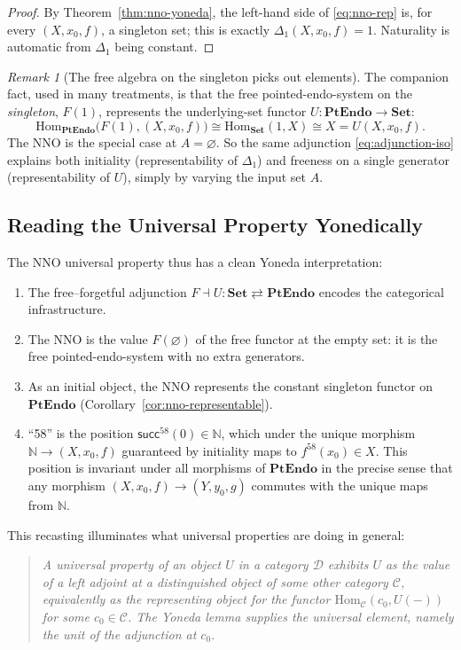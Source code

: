 \documentclass[12pt]{article}
\theoremstyle{definition}
\theoremstyle{remark}
\newtheorem{remark}[theorem]{Remark}
\newcommand{\N}{\mathbb{N}}
\newcommand{\Set}{\mathbf{Set}}
\newcommand{\Hom}{\mathrm{Hom}}
\newcommand{\suc}{\mathsf{succ}}
\newcommand{\PtEndo}{\mathbf{PtEndo}}
\begin{document}
\begin{proof}
By Theorem~\ref{thm:nno-yoneda}, the left-hand side of \eqref{eq:nno-rep} is, for every $(X, x_0, f)$, a singleton set; this is exactly $\Delta_1(X, x_0, f) = 1$. Naturality is automatic from $\Delta_1$ being constant.
\end{proof}

\begin{remark}[The free algebra on the singleton picks out elements]
The companion fact, used in many treatments, is that the free pointed-endo-system on the \emph{singleton}, $F(1)$, represents the underlying-set functor $U \colon \PtEndo \to \Set$:
\[
\Hom_{\PtEndo}\bigl(F(1), (X, x_0, f)\bigr) \cong \Hom_{\Set}(1, X) \cong X = U(X, x_0, f).
\]
The NNO is the special case at $A = \varnothing$. So the same adjunction \eqref{eq:adjunction-iso} explains both initiality (representability of $\Delta_1$) and freeness on a single generator (representability of $U$), simply by varying the input set $A$.
\end{remark}

\subsection{Reading the Universal Property Yonedically}

The NNO universal property thus has a clean Yoneda interpretation:
\begin{enumerate}
  \item The free--forgetful adjunction $F \dashv U \colon \Set \rightleftarrows \PtEndo$ encodes the categorical infrastructure.
  \item The NNO is the value $F(\varnothing)$ of the free functor at the empty set: it is the free pointed-endo-system with no extra generators.
  \item As an initial object, the NNO represents the constant singleton functor on $\PtEndo$ (Corollary~\ref{cor:nno-representable}).
  \item ``58'' is the position $\suc^{58}(0) \in \N$, which under the unique morphism $\N \to (X, x_0, f)$ guaranteed by initiality maps to $f^{58}(x_0) \in X$. This position is invariant under all morphisms of $\PtEndo$ in the precise sense that any morphism $(X, x_0, f) \to (Y, y_0, g)$ commutes with the unique maps from $\N$.
\end{enumerate}

This recasting illuminates what universal properties are doing in general:
\begin{quote}
\itshape
A universal property of an object $U$ in a category $\mathcal{D}$ exhibits $U$ as the value of a left adjoint at a distinguished object of some other category $\mathcal{C}$, equivalently as the representing object for the functor $\Hom_{\mathcal{C}}(c_0, U(-))$ for some $c_0 \in \mathcal{C}$. The Yoneda lemma supplies the universal element, namely the unit of the adjunction at $c_0$.
\end{quote}
\end{document}
